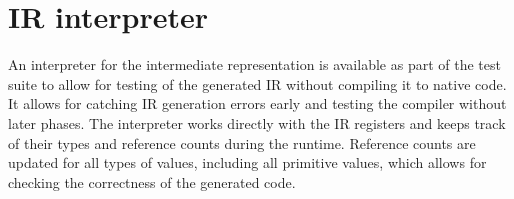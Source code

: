 \section{IR interpreter}

An interpreter for the intermediate representation is available as part of the test suite to allow for testing of the generated IR without compiling it to native code. It allows for catching IR generation errors early and testing the compiler without later phases. The interpreter works directly with the IR registers and keeps track of their types and reference counts during the runtime. Reference counts are updated for all types of values, including all primitive values, which allows for checking the correctness of the generated code.
